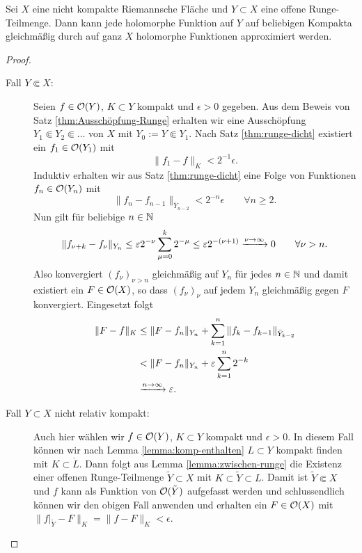 \begin{thm}
  \label{thm:runge}
  Sei $X$ eine nicht kompakte Riemannsche Fläche und $Y \subset X$ eine
  offene Runge-Teilmenge.
  Dann kann jede holomorphe Funktion auf $Y$ auf beliebigen Kompakta
  gleichmäßig durch auf ganz $X$ holomorphe Funktionen approximiert werden.
\end{thm}

\begin{proof}
  \begin{description}
  \item[Fall $Y \Subset X$:] Seien $f \in \mathcal{O}(Y)$, $K \subset Y$
    kompakt und $\epsilon > 0$ gegeben. 
    Aus dem Beweis von Satz \ref{thm:Ausschöpfung-Runge} erhalten wir
    eine Ausschöpfung$Y_1
    \Subset Y_2 \Subset \dots$ von $X$ mit $Y_0 := Y \Subset Y_1$. 
    Nach Satz \ref{thm:runge-dicht} existiert ein $f_1 \in \mathcal{O}(Y_1)$
    mit
    \[
    \|f_1 - f\|_K < 2^{-1} \epsilon.
    \]
    Induktiv erhalten wir aus Satz \ref{thm:runge-dicht} eine Folge
    von Funktionen $f_n \in \mathcal{O}(Y_n)$ mit
    \[
    \|f_n - f_{n-1}\|_{\bar Y_{n-2}} < 2^{-n} \epsilon \qquad \forall
    n \geq 2.
    \]
    Nun gilt für beliebige $n \in \mathbb{N}$
    \[
    \|f_{\nu + k} - f_{\nu} \|_{Y_n} \leq \varepsilon 2^{-\nu} \sum_{\mu
      = 0}^k 2^{-\mu} \leq  \varepsilon 2^{-(\nu+1)} \xrightarrow{\nu \rightarrow
      \infty} 0 \qquad \forall \nu > n.
    \]
    Also konvergiert $(f_\nu)_{\nu > n}$ gleichmäßig auf $Y_n$ für
    jedes $n \in \mathbb{N}$ und damit existiert ein $F \in \mathcal{O}(X)$, so dass
    $(f_\nu)_{\nu}$ auf jedem $Y_n$ gleichmäßig gegen $F$ konvergiert. Eingesetzt folgt
    \begin{align*}
      \|F - f\|_K & \leq \|F - f_n\|_{Y_n} + \sum_{k=1}^n \|f_k -
      f_{k-1}\|_{\bar Y_{k-2}} \\
      & < \|F - f_n \|_{Y_n} + \varepsilon \sum_{k=1}^n 2^{-k} \\
      & \xrightarrow{n \rightarrow \infty} \varepsilon.
    \end{align*}
  \item[Fall $Y \subset X$ nicht relativ kompakt:] Auch hier wählen
    wir $f \in \mathcal{O}(Y)$, $K \subset Y$ kompakt und $\epsilon > 0$. In
    diesem Fall können wir nach Lemma \ref{lemma:komp-enthalten}  $L
    \subset Y$ kompakt finden mit $K \subset 
    \mathring L$. Dann folgt aus Lemma \ref{lemma:zwischen-runge} die Existenz einer
    offenen Runge-Teilmenge
    $\tilde Y \subset X$ mit $K \subset \tilde Y \subset L$. 
    Damit ist $\tilde Y \Subset X$ und $f$ kann als Funktion von
    $\mathcal{O}(\tilde Y)$ aufgefasst werden und schlussendlich können wir
    den obigen Fall anwenden und erhalten ein $F \in \mathcal{O}(X)$ mit
    $\|f|_{\tilde Y} - F\|_K = \|f - F\|_K < \epsilon$.
  \end{description}
\end{proof}

